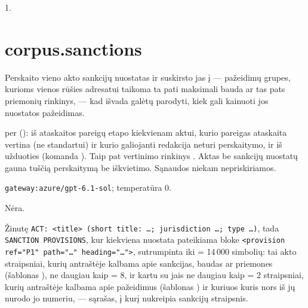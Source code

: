  1.


\section{corpus.sanctions}\label{sec:aprompts:corpus-sanctions}

 Perskaito vieno akto sankcijų nuostatas ir suskirsto jas į
 --- pažeidimų grupes, kurioms vienos rūšies adresatui taikoma ta pati maksimali
bauda ar tas pats priemonių rinkinys, --- kad išvada galėtų parodyti, kiek gali kainuoti jos
nuostatos pažeidimas.

  per 
(): iš ataskaitos pareigų etapo kiekvienam aktui, kurio pareigas
ataskaita vertina (ne standartui) ir kurio galiojanti redakcija neturi perskaitymo, ir iš
užduoties  (komanda ). Taip pat vertinimo
rinkinys . Aktas be sankcijų nuostatų gauna tuščią perskaitymą be iškvietimo.
Sąnaudos niekam nepriskiriamos.

 \texttt{gateway:azure/gpt-6.1-sol}; temperatūra 0.

 Nėra.

 Žinutę \texttt{ACT: <title> (short title: …; jurisdiction …; type …)}, tada \texttt{SANCTION PROVISIONS}, kur kiekviena nuostata pateikiama bloke
\texttt{<provision ref="P1" path="…" heading="…">}, sutrumpinta iki  = 14\,000
simbolių: tai akto straipsniai, kurių antraštėje kalbama apie sankcijas, baudas ar priemones
(šablonas ), ne daugiau kaip  = 8, ir kartu su jais ne daugiau
kaip  = 2 straipsniai, kurių antraštėje kalbama apie pažeidimus (šablonas
) ir kuriuos kuris nors iš jų nurodo jo numeriu, --- sąrašas, į kurį nukreipia
sankcijų straipsnis.

